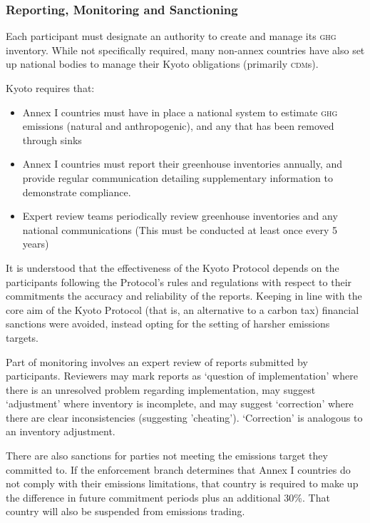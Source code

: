 \subsubsection{Reporting, Monitoring and Sanctioning}

Each participant must designate an authority to create and manage its \textsc{ghg} inventory. While not specifically required, many non-annex countries have also set up national bodies to manage their Kyoto obligations (primarily \textsc{cdm}s).

Kyoto requires that:~\cite{UNFCCC-Kyoto-guidelines}

\begin{itemize}
	\item Annex I countries must have in place a national system to estimate \textsc{ghg} emissions (natural and anthropogenic), and any \CO that has been removed through sinks
	\item Annex I countries must report their greenhouse inventories annually, and provide regular communication detailing supplementary information to demonstrate compliance.
	\item Expert review teams periodically review greenhouse inventories and any national communications (This must be conducted at least once every 5 years)
\end{itemize}

It is understood that the effectiveness of the Kyoto Protocol depends on the participants following the Protocol's rules and regulations with respect to their commitments the accuracy and reliability of the reports. Keeping in line with the core aim of the Kyoto Protocol (that is, an alternative to a carbon tax) financial sanctions were avoided, instead opting for the setting of harsher emissions targets.

Part of monitoring involves an expert review of reports submitted by participants. Reviewers may mark reports as `question of implementation' where there is an unresolved problem regarding implementation, may suggest `adjustment' where inventory is incomplete, and may suggest `correction' where there are clear inconsistencies (suggesting 'cheating'). `Correction' is analogous to an inventory adjustment.~\cite{UNFCCC-reporting-review}

There are also sanctions for parties not meeting the emissions target they committed to. If the enforcement branch determines that Annex I countries do not comply with their emissions limitations, that country is required to make up the difference in future commitment periods plus an additional 30\%. That country will also be suspended from emissions trading.~\cite{UNFCCC-compliance}

